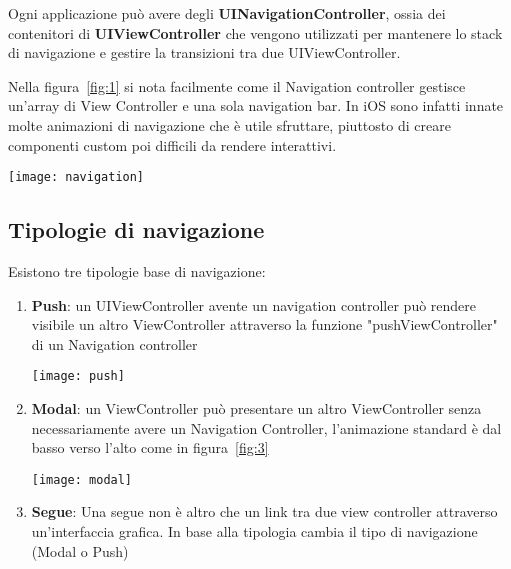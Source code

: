 Ogni applicazione può avere degli \textbf{UINavigationController}\cite{navigationcontroller},
ossia dei contenitori di \textbf{UIViewController}\cite{viewcontroller} che vengono
utilizzati per mantenere lo stack di navigazione e gestire la transizioni tra due UIViewController.

Nella figura~\ref{fig:1} si nota facilmente come il Navigation controller gestisce un'array di View Controller e una sola 
navigation bar. 
In iOS sono infatti innate molte animazioni di navigazione che è utile sfruttare, piuttosto di creare 
componenti custom poi difficili da rendere interattivi.\\

\begin{minipage}{\linewidth}
    \centering
    \texttt{[image: navigation]}
    \label{fig:1}
\end{minipage}

\subsection{Tipologie di navigazione}\label{sec:navigation}

Esistono tre tipologie base di navigazione:


\begin{enumerate}
    \item{\textbf{Push}: un UIViewController avente un navigation controller può rendere
    visibile un altro ViewController attraverso la funzione "pushViewController" di un Navigation controller\par
    \begin{minipage}{\linewidth}
        \centering
        \texttt{[image: push]}
        \label{fig:2}
    \end{minipage}
    }
    \item{ \textbf{Modal}: un ViewController può presentare un altro ViewController senza necessariamente avere un 
        Navigation Controller, l'animazione standard è dal basso verso l'alto come in figura~\ref{fig:3}\par
        \begin{minipage}{\linewidth}
            \centering
            \texttt{[image: modal]}
            \label{fig:3}
        \end{minipage}
    }
    \item{\textbf{Segue}: Una segue non è altro che un link tra due view controller attraverso un'interfaccia
        grafica. In base alla tipologia cambia il tipo di navigazione (Modal o Push)
    }
\end{enumerate}

